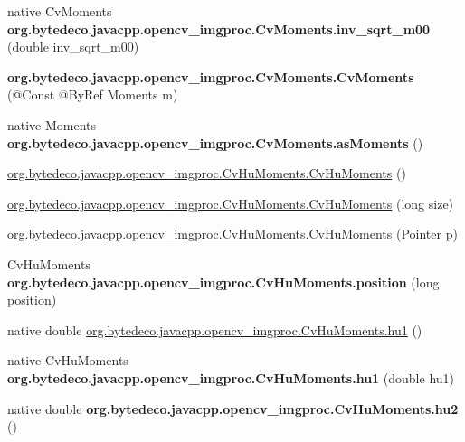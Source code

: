 \begin{DoxyCompactItemize}
\mbox{\label{group__imgproc_gac461efcb53bffee02018042aa028d3a1}} 
native Cv\+Moments {\bfseries org.\+bytedeco.\+javacpp.\+opencv\+\_\+imgproc.\+Cv\+Moments.\+inv\+\_\+sqrt\+\_\+m00} (double inv\+\_\+sqrt\+\_\+m00)
\item 
\mbox{\label{group__imgproc_ga3ba64f9c583447ca3b413a7c42dcec78}} 
{\bfseries org.\+bytedeco.\+javacpp.\+opencv\+\_\+imgproc.\+Cv\+Moments.\+Cv\+Moments} (@Const @By\+Ref Moments m)
\item 
\mbox{\label{group__imgproc_gabba7564234731b60220196eac96fdb17}} 
native Moments {\bfseries org.\+bytedeco.\+javacpp.\+opencv\+\_\+imgproc.\+Cv\+Moments.\+as\+Moments} ()
\item 
\hyperlink{group__imgproc_gaa96e192ed68a69f71a564aebb1dcaa1c}{org.\+bytedeco.\+javacpp.\+opencv\+\_\+imgproc.\+Cv\+Hu\+Moments.\+Cv\+Hu\+Moments} ()
\item 
\hyperlink{group__imgproc_ga49ec073e3eeffc03d3af742e7d041f31}{org.\+bytedeco.\+javacpp.\+opencv\+\_\+imgproc.\+Cv\+Hu\+Moments.\+Cv\+Hu\+Moments} (long size)
\item 
\hyperlink{group__imgproc_gabbb1bbfe04e1af632620c299c521d9cb}{org.\+bytedeco.\+javacpp.\+opencv\+\_\+imgproc.\+Cv\+Hu\+Moments.\+Cv\+Hu\+Moments} (Pointer p)
\item 
\mbox{\label{group__imgproc_gaa6eba2c61eb3430d288b54d99e8e644c}} 
Cv\+Hu\+Moments {\bfseries org.\+bytedeco.\+javacpp.\+opencv\+\_\+imgproc.\+Cv\+Hu\+Moments.\+position} (long position)
\item 
native double \hyperlink{group__imgproc_ga3a5ac276dbc52bfd18cfbbff94aa8cf5}{org.\+bytedeco.\+javacpp.\+opencv\+\_\+imgproc.\+Cv\+Hu\+Moments.\+hu1} ()
\item 
\mbox{\label{group__imgproc_ga7082b95d9fdb9c5a5afbd5dd4fee9109}} 
native Cv\+Hu\+Moments {\bfseries org.\+bytedeco.\+javacpp.\+opencv\+\_\+imgproc.\+Cv\+Hu\+Moments.\+hu1} (double hu1)
\item 
\mbox{\label{group__imgproc_ga539833f370de142f267f5572bcf373a5}} 
native double {\bfseries org.\+bytedeco.\+javacpp.\+opencv\+\_\+imgproc.\+Cv\+Hu\+Moments.\+hu2} ()
\item 
\mbox{\label{group__imgproc_ga64bea531850fb91908dc0a4c459f0383}} 

\end{DoxyCompactItemize}
